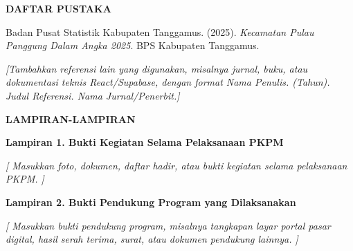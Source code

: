 \documentclass[12pt,a4paper]{article}
\newcommand{\headingfont}{\fontsize{14}{17}\selectfont}
\newcommand{\placeholder}[1]{\textit{[#1]}}
\begin{document}
\clearpage

{}

\begin{center}
    {
        \headingfont
        \bfseries
        DAFTAR PUSTAKA
    }
\end{center}

\vspace{1cm}

\begin{flushleft}
Badan Pusat Statistik Kabupaten Tanggamus. (2025). \textit{Kecamatan
Pulau Panggung Dalam Angka 2025}. BPS Kabupaten Tanggamus.

\placeholder{Tambahkan referensi lain yang digunakan, misalnya
jurnal, buku, atau dokumentasi teknis React/Supabase, dengan format
Nama Penulis. (Tahun). Judul Referensi. Nama Jurnal/Penerbit.}
\end{flushleft}

\clearpage

{}

\begin{center}
    {
        \headingfont
        \bfseries
        LAMPIRAN-LAMPIRAN
    }
\end{center}

\vspace{1cm}

\textbf{
    Lampiran 1. Bukti Kegiatan Selama Pelaksanaan PKPM
}

\vspace{0.5cm}

\placeholder{
    Masukkan foto, dokumen, daftar hadir,
    atau bukti kegiatan selama pelaksanaan PKPM.
}

\vspace{1cm}

\textbf{
    Lampiran 2. Bukti Pendukung Program yang Dilaksanakan
}

\vspace{0.5cm}

\placeholder{
    Masukkan bukti pendukung program,
    misalnya tangkapan layar portal pasar digital,
    hasil serah terima, surat,
    atau dokumen pendukung lainnya.
}
\end{document}
